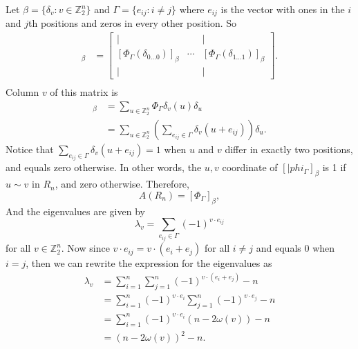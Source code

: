 \documentclass[12pt]{article}
\newcommand{\Z}{\mathbb{Z}}
\newcommand{\ds}{\displaystyle}
\begin{document}
Let $\beta=\{\delta_v: v\in\Z_2^n\}$ and $\Gamma=\{e_{ij}: i\ne j\}$ where $e_{ij}$ is the vector with ones in the $i$ and $j$th positions and zeros in every other position. So
\begin{align*}
    [\Phi_\Gamma]_\beta
        &= \begin{bmatrix}
            | & & | \\
            [\Phi_\Gamma(\delta_{0\dots0})]_\beta & \cdots & [\Phi_\Gamma(\delta_{1\dots1})]_\beta \\
            | & & |
        \end{bmatrix}. \\
\end{align*}
Column $v$ of this matrix is
\begin{align*}
    [\Phi_\Gamma(\delta_v)]_\beta
        &= \sum_{u\in\Z_2^n}\Phi_\Gamma\delta_v(u)\delta_u \\
        &= \sum_{u\in\Z_2^n}\left(\sum_{e_{ij}\in\Gamma}\delta_v(u+e_{ij})\right)\delta_u.
\end{align*}
Notice that $\ds\sum_{e_{ij}\in\Gamma}\delta_v(u+e_{ij})=1$ when $u$ and $v$ differ in exactly two positions, and equals zero otherwise. In other words, the $u,v$ coordinate of $[|phi_\Gamma]_\beta$ is 1 if $u\sim v$ in $R_n$, and zero otherwise. Therefore,
\[A(R_n) = [\Phi_\Gamma]_\beta,\]
And the eigenvalues are given by
\[\lambda_v = \sum_{e_{ij}\in\Gamma}(-1)^{v\cdot e_{ij}}\]
for all $v\in\Z_2^n$. Now since $v\cdot e_{ij}=v\cdot(e_i+e_j)$ for all $i\ne j$ and equals 0 when $i=j$, then we can rewrite the expression for the eigenvalues as
\begin{align*}
    \lambda_v 
        &= \sum_{i=1}^n\sum_{j=1}^n(-1)^{v\cdot (e_i + e_j)} - n \\
        &= \sum_{i=1}^n(-1)^{v\cdot e_i}\sum_{j=1}^n(-1)^{v \cdot e_j} - n \\
        &= \sum_{i=1}^n(-1)^{v\cdot e_i}(n-2\omega(v)) - n \\
        &= (n-2\omega(v))^2 - n.
\end{align*}
\end{document}
